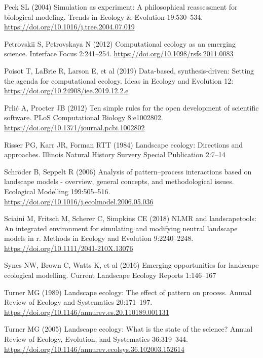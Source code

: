 \documentclass[
  12pt,
  a4paperpaper,
]{article}
\newlength{\cslhangindent}
\newenvironment{CSLReferences}[2] %
 {\begin{list}{}{%
  \setlength{\itemindent}{0pt}
  \setlength{\leftmargin}{0pt}
  \setlength{\parsep}{0pt}
  \ifodd #1
   \setlength{\leftmargin}{\cslhangindent}
   \setlength{\itemindent}{-1\cslhangindent}
  \fi
  \setlength{\itemsep}{#2\baselineskip}}}
 {\end{list}}
\begin{document}
\begin{CSLReferences}{1}{1}
Peck SL (2004) Simulation as experiment: A philosophical reassessment
for biological modeling. Trends in Ecology \& Evolution 19:530--534.
\url{https://doi.org/10.1016/j.tree.2004.07.019}

Petrovskii S, Petrovskaya N (2012) Computational ecology as an emerging
science. Interface Focus 2:241--254.
\url{https://doi.org/10.1098/rsfs.2011.0083}

Poisot T, LaBrie R, Larson E, et al (2019) Data-based, synthesis-driven:
Setting the agenda for computational ecology. Ideas in Ecology and
Evolution 12: \url{https://doi.org/10.24908/iee.2019.12.2.e}

Prlić A, Procter JB (2012) Ten simple rules for the open development of
scientific software. PLoS Computational Biology 8:e1002802.
\url{https://doi.org/10.1371/journal.pcbi.1002802}

Risser PG, Karr JR, Forman RTT (1984) Landscape ecology: Directions and
approaches. Illinois Natural History Survery Special Publication 2:7--14

Schröder B, Seppelt R (2006) Analysis of pattern--process interactions
based on landscape models - overview, general concepts, and
methodological issues. Ecological Modelling 199:505--516.
\url{https://doi.org/10.1016/j.ecolmodel.2006.05.036}

Sciaini M, Fritsch M, Scherer C, Simpkins CE (2018) NLMR and
landscapetools: An integrated environment for simulating and modifying
neutral landscape models in r. Methods in Ecology and Evolution
9:2240--2248. \url{https://doi.org/10.1111/2041-210X.13076}

Synes NW, Brown C, Watts K, et al (2016) Emerging opportunities for
landscape ecological modelling. Current Landscape Ecology Reports
1:146--167

Turner MG (1989) Landscape ecology: The effect of pattern on process.
Annual Review of Ecology and Systematics 20:171--197.
\url{https://doi.org/10.1146/annurev.es.20.110189.001131}

Turner MG (2005) Landscape ecology: What is the state of the science?
Annual Review of Ecology, Evolution, and Systematics 36:319--344.
\url{https://doi.org/10.1146/annurev.ecolsys.36.102003.152614}


\end{CSLReferences}
\end{document}
